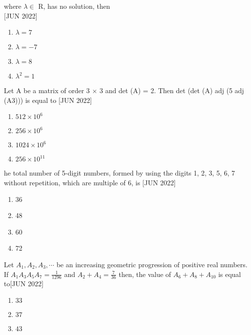     where $\lambda$$\in$ R, has no solution, then \\\hfill{[JUN 2022]}
    \begin{multicols}{4}
    \begin{enumerate}
        \item $\lambda = 7$
        \item $\lambda = -7$
        \item $\lambda = 8$
        \item $\lambda^2 = 1$
    \end{enumerate} 
    \end{multicols}
    \bigskip
    \item Let A be a matrix of order 3 $\times$ 3 and det (A) = 2. Then det (det (A) adj (5 adj (A3))) is equal to  \hfill{[JUN 2022]}
    \begin{multicols}{2}
    \begin{enumerate}
        \item $512\times 10^6$
        \item $256\times 10^6$
        \item $1024\times 10^6$
        \item $256\times 10^{11}$
    \end{enumerate} 
    \end{multicols}
    \bigskip
    \item he total number of 5-digit numbers, formed by using the digits 1, 2, 3, 5, 6, 7 without repetition, which are multiple of 6, is \hfill{[JUN 2022]}
    \begin{multicols}{4}
    \begin{enumerate}
        \item 36
        \item 48
        \item 60
        \item 72
    \end{enumerate} 
    \end{multicols}
    \bigskip
    \item Let $A_1, A_2, A_3, \cdots $ be an increasing geometric progression of positive real numbers. If $A_1A_3A_5A_7 = \frac{1}{1296}$ and $A_2 + A_4 = \frac{7}{36}$ then, the value of $A_6 + A_8 + A_{10}$ is equal to\hfill{[JUN 2022]} 
    \begin{multicols}{4}
    \begin{enumerate}
        \item $33$
        \item $37$
        \item $43$

\end{enumerate}
\end{multicols}$$
